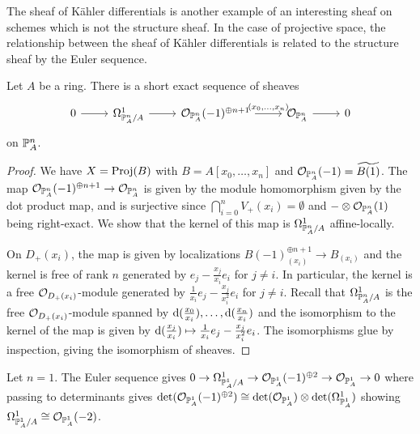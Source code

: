 The sheaf of K\"{a}hler differentials is another example of an interesting sheaf on schemes which is not the structure sheaf. In the case of projective space, the relationship between the sheaf of K\"{a}hler differentials is related to the structure sheaf by the Euler sequence. 
\begin{theorem}\label{thm: Euler sequence}
    Let $A$ be a ring. There is a short exact sequence of sheaves 
    $$%
    \begin{tikzcd}
        0 & {\Omega^{1}_{\PP^{n}_{A}/A}} & {\Ocal_{\PP^{n}_{A}}(-1)^{\oplus n+1}} & {\Ocal_{\PP^{n}_{A}}} & 0
        \arrow[from=1-1, to=1-2]
        \arrow[from=1-2, to=1-3]
        \arrow["{(x_{0},\dots,x_{n})}", from=1-3, to=1-4]
        \arrow[from=1-4, to=1-5]
    \end{tikzcd}$$
    on $\mathbb{P}^{n}_{A}$. 
\end{theorem}
\begin{proof}
    We have $X=\operatorname{Proj}(B)$ with $B=A[x_{0},\dots,x_{n}]$ and $\mathcal{O}_{\mathbb{P}^{n}_{A}}(-1)=\widetilde{B(1)}$. The map $\mathcal{O}_{\mathbb{P}^{n}_{A}}(-1)^{\oplus n+1}\to\mathcal{O}_{\mathbb{P}^{n}_{A}}$ is given by the module homomorphism given by the dot product map, and is surjective since $\bigcap_{i=0}^{n}V_{+}(x_{i})=\emptyset$ and $-\otimes\mathcal{O}_{\mathbb{P}^{n}_{A}}(1)$ being right-exact. We show that the kernel of this map is $\Omega^{1}_{\mathbb{P}^{n}_{A}/A}$ affine-locally. 

    On $D_{+}(x_{i})$, the map is given by localizations $B(-1)^{\oplus n+1}_{(x_{i})}\to B_{(x_{i})}$ and the kernel is free of rank $n$ generated by $e_{j}-\frac{x_{j}}{x_{i}}e_{i}$ for $j\neq i$. In particular, the kernel is a free $\mathcal{O}_{D_{+}(x_{i})}$-module generated by $\frac{1}{x_{i}}e_{j}-\frac{x_{j}}{x_{i}^{2}}e_{i}$ for $j\neq i$. Recall that $\Omega^{1}_{\mathbb{P}^{n}_{A}/A}$ is the free $\mathcal{O}_{D_{+}(x_{i})}$-module spanned by $\mathrm{d}(\frac{x_{0}}{x_{i}}),\dots,\mathrm{d}(\frac{x_{n}}{x_{i}})$ and the isomorphism to the kernel of the map is given by $\mathrm{d}(\frac{x_{j}}{x_{i}})\mapsto \frac{1}{x_{i}}e_{j}-\frac{x_{j}}{x_{i}^{2}}e_{i}$. The isomorphisms glue by inspection, giving the isomorphism of sheaves. 
\end{proof}
\begin{example}
    Let $n=1$. The Euler sequence gives $0\to\Omega^{1}_{\mathbb{P}^{1}_{A}/A}\to\mathcal{O}_{\mathbb{P}^{1}_{A}}(-1)^{\oplus 2}\to\mathcal{O}_{\mathbb{P}^{1}_{A}}\to0$ where passing to determinants gives $\det(\mathcal{O}_{\mathbb{P}^{1}_{A}}(-1)^{\oplus 2})\cong\det(\mathcal{O}_{\mathbb{P}^{1}_{A}})\otimes\det(\Omega^{1}_{\mathbb{P}^{1}_{A}})$ showing $\Omega^{1}_{\mathbb{P}^{1}_{A}/A}\cong\mathcal{O}_{\mathbb{P}^{1}_{A}}(-2)$. 
\end{example}
